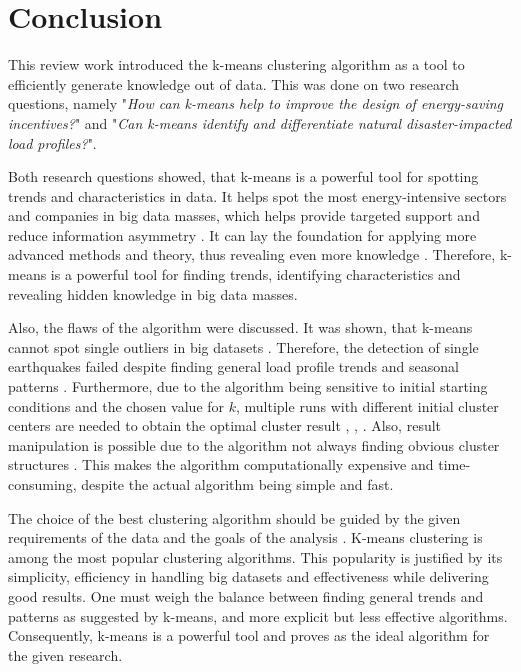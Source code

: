 \section{Conclusion}
\label{cha:conclusion}



This review work introduced the k-means clustering algorithm as a tool to efficiently generate knowledge out of data.
This was done on two research questions, namely "\textit{How can k-means help to improve the design of energy-saving incentives?}" and "\textit{Can k-means identify and differentiate natural disaster-impacted load profiles?}".

Both research questions showed, that k-means is a powerful tool for spotting trends and characteristics in data.
It helps spot the most energy-intensive sectors and companies in big data masses, which helps provide targeted support and reduce information asymmetry \cite{LIU-BDE}.
It can lay the foundation for applying more advanced methods and theory, thus revealing even more knowledge \cite{MAL-HBP}.
Therefore, k-means is a powerful tool for finding trends, identifying characteristics and revealing hidden knowledge in big data masses.

Also, the flaws of the algorithm were discussed.
It was shown, that k-means cannot spot single outliers in big datasets \cite{JES-IND}.
Therefore, the detection of single earthquakes failed despite finding general load profile trends and seasonal patterns \cite{JES-IND}.
Furthermore, due to the algorithm being sensitive to initial starting conditions and the chosen value for $k$, multiple runs with different initial cluster centers are needed to obtain the optimal cluster result \cite{JAI-DCB}, \cite{EZU-CPF}, \cite{BAR-LVG}.
Also, result manipulation is possible due to the algorithm not always finding obvious cluster structures \cite{BOU-RPK}.
This makes the algorithm computationally expensive and time-consuming, despite the actual algorithm being simple and fast.

The choice of the best clustering algorithm should be guided by the given requirements of the data and the goals of the analysis \cite{COL-ALT}.
K-means clustering is among the most popular clustering algorithms.
This popularity is justified by its simplicity, efficiency in handling big datasets and effectiveness while delivering good results.
One must weigh the balance between finding general trends and patterns as suggested by k-means, and more explicit but less effective algorithms.
Consequently, k-means is a powerful tool and proves as the ideal algorithm for the given research.
